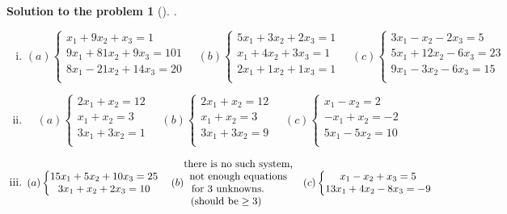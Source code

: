 \documentclass[12pt,a4]{article}
\newtheorem{solution}{Solution to the problem}
\begin{document}
\begin{solution}[]\rm
.\\
\begin{enumerate}[(i)]
\item
\[
(a)
\left\{\begin{matrix}
x_1 + 9x_2 + x_3 = 1 \\
9x_1 + 81x_2 + 9x_3 = 101 \\
8x_1 - 21x_2 + 14x_3 = 20 \\
\end{matrix}\right.
\quad (b)
\left\{\begin{matrix}
5x_1 + 3x_2 + 2x_3 = 1 \\
x_1 + 4x_2 + 3x_3 = 1 \\
2x_1 + 1x_2 + 1x_3 = 1 \\
\end{matrix}\right.
\quad (c)
\left\{\begin{matrix}
3x_1 - x_2 - 2x_3 = 5 \\
5x_1 + 12x_2 - 6x_3 = 23 \\
9x_1 - 3x_2 - 6x_3 = 15 \\
\end{matrix}\right.
\]
\item
\[
(a)
\left\{\begin{matrix}
2x_1 +  x_2 = 12 \\
 x_1 +  x_2 = 3 \\
3x_1 + 3x_2 = 1 \\
\end{matrix}\right.
\quad (b)
\left\{\begin{matrix}
2x_1 +  x_2 = 12 \\
 x_1 +  x_2 = 3 \\
3x_1 + 3x_2 = 9 \\
\end{matrix}\right.
\quad (c)
\left\{\begin{matrix}
x_1 - x_2 = 2 \\
-x_1 + x_2 = -2 \\
5x_1 - 5x_2 = 10 \\
\end{matrix}\right.
\]
\item
\[
(a)
\left\{\begin{matrix}
15x_1 + 5x_2 + 10x_3 = 25 \\
3x_1 + x_2 + 2x_3 = 10 \\
\end{matrix}\right.
\quad (b)
\begin{matrix}
\text{there is no such system,}\\
\text{not enough equations}\\
\text{for 3 unknowns.\qquad}\\
\text{(should be} \geq 3)~\qquad
\end{matrix}
\quad (c)
\left\{\begin{matrix}
x_1 - x_2 + x_3 = 5 \\
13x_1 + 4x_2 - 8x_3 = -9 \\
\end{matrix}\right.
\]
\end{enumerate}\end{solution}
\end{document}
